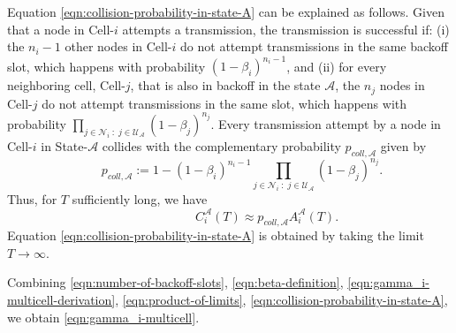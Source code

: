 \documentclass[10pt,a4paper,journal]{IEEEtran}
\theoremstyle{definition}
\theoremstyle{remark}
\theoremstyle{plain}
\begin{document}
Equation \eqref{eqn:collision-probability-in-state-A} can be explained
as follows. Given that a node in Cell-$i$ attempts a transmission, the
transmission is successful if: (i) the $n_i-1$ other nodes in Cell-$i$
do not attempt transmissions in the same backoff slot, which happens
with probability $(1-\beta_i)^{n_i-1}$, and (ii) for every neighboring
cell, Cell-$j$, that is also in backoff in the state $\mathcal{A}$,
the $n_j$ nodes in Cell-$j$ do not attempt transmissions in the same
slot, which happens with probability $\prod_{j \in \mathcal{N}_i \; :
  \; j \in \mathcal{U}_{\mathcal{A}}}(1-\beta_j)^{n_j}$. Every
transmission attempt by a node in Cell-$i$ in State-$\mathcal{A}$
collides with the complementary probability $p_{coll,\mathcal{A}}$
given by 
\[\quad \quad p_{coll,\mathcal{A}} := 1 - (1-\beta_i)^{n_i-1} \prod_{j \in
  \mathcal{N}_i \; : \; j \in \mathcal{U}_{\mathcal{A}}}
(1-\beta_j)^{n_j}.\] 
Thus, for $T$ sufficiently long, we have 
\[\quad \quad \quad \quad \quad \quad C_i^{\mathcal{A}}(T) \approx p_{coll,\mathcal{A}} A_i^{\mathcal{A}}(T).\]
Equation \eqref{eqn:collision-probability-in-state-A} is obtained by taking the
limit $T \longrightarrow \infty$. 

Combining \eqref{eqn:number-of-backoff-slots}, \eqref{eqn:beta-definition}, \eqref{eqn:gamma_i-multicell-derivation}, \eqref{eqn:product-of-limits}, \eqref{eqn:collision-probability-in-state-A}, we obtain \eqref{eqn:gamma_i-multicell}. 






\end{document}
